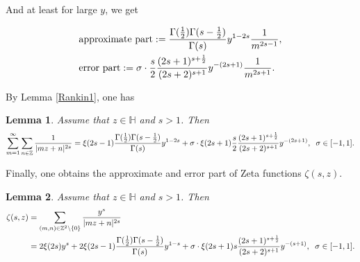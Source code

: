 \documentclass[reqno,english]{amsart}
\newtheorem{lemma}{Lemma}[section]
\newtheorem{open problem}{Open Problem}[section]
\newtheorem{open question}{Open Question}[section]
\newtheorem{open questions on hexagonal lattice}{Open Questions on hexagonal lattice}[section]
\begin{document}
And at least for large $y$, we get

\begin{equation}\aligned\nonumber
&\hbox{approximate part}:=\frac{\Gamma(\frac{1}{2})\Gamma(s-\frac{1}{2})}{\Gamma(s)}y^{1-2s}\frac{1}{m^{2s-1}},\\
&\hbox{error part}:=\sigma\cdot\frac{s}{2}\frac{(2s+1)^{s+\frac{1}{2}}}{(2s+2)^{s+1}}y^{-(2s+1)}\frac{1}{m^{2s+1}}.
 \endaligned\end{equation}


By Lemma \ref{Rankin1}, one has


\begin{lemma}\label{Rankin2} Assume that $z\in \mathbb{H}$ and $s>1$. Then
\begin{equation}\aligned\nonumber
\sum_{m=1}^\infty\sum_{n\in\mathbb{Z}}\frac{1}{|mz+n|^{2s}}=\xi(2s-1)\frac{\Gamma(\frac{1}{2})\Gamma(s-\frac{1}{2})}{\Gamma(s)}y^{1-2s}
+\sigma\cdot\xi(2s+1)\frac{s}{2}\frac{(2s+1)^{s+\frac{1}{2}}}{(2s+2)^{s+1}}y^{-(2s+1)},\;\;\sigma\in[-1,1].
 \endaligned\end{equation}

\end{lemma}

Finally, one obtains the approximate and error part of Zeta functions $\zeta(s,z)$.

\begin{lemma}\label{Rankin3} Assume that $z\in \mathbb{H}$ and $s>1$. Then
 \begin{equation}\aligned\nonumber
\zeta(s,z)&=\sum_{(m,n)\in\mathbb{Z}^2\backslash\{0\}}\frac{y^s}{|mz+n|^{2s}}\\
&=2\xi(2s)y^s+
2\xi(2s-1)\frac{\Gamma(\frac{1}{2})\Gamma(s-\frac{1}{2})}{\Gamma(s)}y^{1-s}
+\sigma\cdot\xi(2s+1)s\frac{(2s+1)^{s+\frac{1}{2}}}{(2s+2)^{s+1}}y^{-(s+1)},\;\;\sigma\in[-1,1].
\endaligned\end{equation}

\end{lemma}
\end{document}
